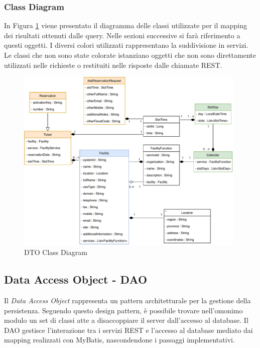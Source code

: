 \subsubsection{Class Diagram}
In Figura \ref{fig:classdiagram} viene presentato il diagramma delle classi utilizzate per il mapping dei risultati ottenuti dalle query. Nelle sezioni successive si farà riferimento a questi oggetti. I diversi colori utilizzati rappresentano la suddivisione in servizi. Le classi che non sono state colorate istanziano oggetti che non sono direttamente utilizzati nelle richieste o restituiti nelle risposte dalle chiamate REST.
\begin{figure}[H]
    \centering
    \includegraphics[width=0.98\textwidth]{images/03_4_class_diagram.pdf}
    \caption{DTO Class Diagram}
    \label{fig:classdiagram}
\end{figure}

\subsection{Data Access Object - DAO}
Il \emph{Data Access Object} rappresenta un pattern architetturale per la gestione della persistenza. Seguendo questo design pattern, è possibile trovare nell'omonimo modulo un set di classi atte a disaccoppiare il server dall'accesso al database. Il DAO gestisce l'interazione tra i servizi REST e l'accesso al database mediato dai mapping realizzati con MyBatis, nascondendone i passaggi implementativi.

